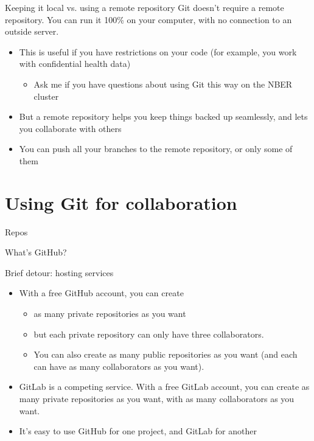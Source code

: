 \documentclass{beamer}
\begin{document}
\begin{frame}{Keeping it local vs. using a remote repository}
Git doesn't require a remote repository. You can run it 100\% on your computer, with no connection to an outside server.
\begin{itemize}
\item This is useful if you have restrictions on your code (for example, you work with confidential health data)
\begin{itemize}
\item Ask me if you have questions about using Git this way on the NBER cluster
\end{itemize}
\item But a remote repository helps you keep things backed up seamlessly, and lets you collaborate with others
\item You can push all your branches to the remote repository, or only some of them
\end{itemize}

\end{frame}

\section{Using Git for collaboration}

\begin{frame}{Repos}
\end{frame}

\begin{frame}{What's GitHub?}
\end{frame}

\begin{frame}{Brief detour: hosting services}
\begin{itemize}
\item With a free GitHub account, you can create
\begin{itemize}
\item as many private repositories as you want
\item but each private repository can only have three collaborators.
\item You can also create as many public repositories as you want (and each can have as many collaborators as you want).
\end{itemize}
\item GitLab is a competing service. With a free GitLab account, you can create as many private repositories as you want, with as many collaborators as you want.
\item It's easy to use GitHub for one project, and GitLab for another
\end{itemize}

\end{frame}
\end{document}
